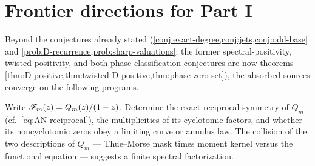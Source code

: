 \section{Frontier directions for Part I}
\label{sec:frontiers-sums}

Beyond the conjectures already stated
(\cref{conj:exact-degree,conj:jets,conj:odd-base}
and \cref{prob:D-recurrence,prob:sharp-valuations}; the former
spectral-positivity, twisted-positivity, and both phase-classification
conjectures are now theorems ---
\cref{thm:D-positive,thm:twisted-D-positive,thm:phase-zero-set}), the
absorbed sources converge on the following programs.

\begin{problem}
\label{prob:row-geometry}
Write $\mathscr F_m(z)=Q_m(z)/(1-z)$.  Determine the exact reciprocal
symmetry of $Q_m$ (cf.\ \eqref{eq:AN-reciprocal}), the multiplicities
of its cyclotomic factors, and whether its noncyclotomic zeros obey a
limiting curve or annulus law.  The collision of the two descriptions
of $Q_m$ --- Thue--Morse mask times moment kernel versus the
functional equation --- suggests a finite spectral factorization.
\end{problem}

